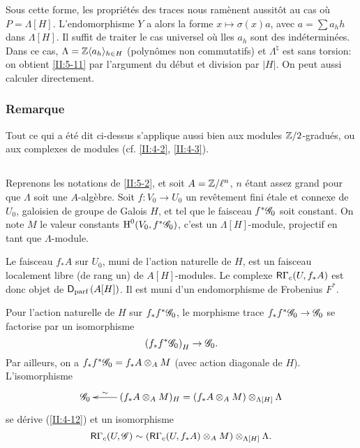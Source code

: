 \documentclass[oneside]{book}
\begin{document}
Sous cette forme, les propri\'et\'es des traces nous ram\`enent aussit\^ot au 
cas o\`u $P=\Lambda[H]$. L'endomorphisme $Y$ a alors la forme 
$x\mapsto \sigma(x) a$, avec $a=\sum a_h h$ dans $\Lambda[H]$. Il suffit de 
traiter le cas universel o\`u lles $a_h$ sont des ind\'etermin\'ees. Dans ce 
cas, $\Lambda=\mathbb{Z}\langle a_h\rangle_{h\in H}$ (polyn\^omes non commutatifs) et 
$\Lambda^\natural$ est sans torsion: on obtient \ref{II:5-11} par l'argument 
du d\'ebut et division par $|H|$. On peut aussi calculer directement. 





\subsubsection{Remarque}\label{II:5-11-1}

Tout ce qui a \'et\'e dit ci-dessus s'applique aussi bien aux modules 
$\mathbb{Z}/2$-gradu\'es, ou aux complexes de modules (cf. \ref{II:4-2}, \ref{II:4-3}). 





\subsection{}\label{II:5-12}

Reprenons les notations de \ref{II:5-2}, et soit $A=\mathbb{Z}/\ell^n$, $n$ \'etant 
assez grand pour que $\Lambda$ soit une $A$-alg\`ebre. Soit $f:V_0\to U_0$ un 
rev\^etement fini \'etale et connexe de $U_0$, galoisien de groupe de Galois 
$H$, et tel que le faisceau $f^*\mathscr{G}_0$ soit constant. On note $M$ le valeur 
constants $\operatorname{H}^0(V_0,f^*\mathscr{G}_0)$, c'est un $\Lambda[H]$-module, projectif en 
tant que $\Lambda$-module. 

Le faisceau $f_* A$ sur $U_0$, muni de l'action naturelle de $H$, est un 
faisceau localement libre (de rang un) de $A[H]$-modules. Le complexe 
$\mathsf{R}\Gamma_c(U,f_* A)$ est donc objet de $\mathsf{D}_\text{parf}\left(A[H]\right)$. Il 
est muni d'un endomorphisme de Frobenius $F^*$. 

Pour l'action naturelle de $H$ sur $f_* f^*\mathscr{G}_0$, le morphisme trace 
$f_* f^*\mathscr{G}_0\to\mathscr{G}_0$ se factorise par un isomorphisme 
\[
  \left(f_* f^*\mathscr{G}_0\right)_H \to \mathscr{G}_0 \text{.}
\]
Par ailleurs, on a $f_* f^*\mathscr{G}_0=f_* A\otimes_A M$ (avec action diagonale de 
$H$). L'isomorphisme 
\[\xymatrix{
  \cG_0 
    & \ar[l]_-\sim (f_* A\otimes_A M)_H = (f_* A\otimes_A M)\otimes_{\Lambda[H]} \Lambda
}\]
se d\'erive (\ref{II:4-12}) et un isomorphisme 
\[
  \mathsf{R}\Gamma_c(U,\mathscr{G}) \sim \left(\mathsf{R}\Gamma_c(U,f_* A)\otimes_A M\right)\otimes_{\Lambda[H]} \Lambda \text{.}
\]
\end{document}
